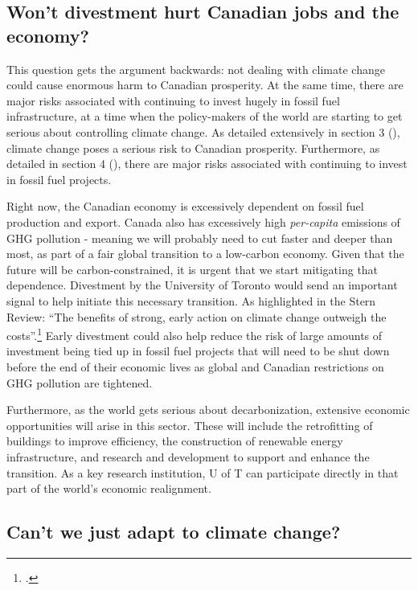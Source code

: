 	\subsection{Won't divestment hurt Canadian jobs and the economy?}
	\label{CanadianJobsEconomy}
	
	

This question gets the argument backwards: not dealing with climate change could cause enormous harm to Canadian prosperity.
At the same time, there are major risks associated with continuing to invest hugely in fossil fuel infrastructure, at a time when the policy-makers of the world are starting to get serious about controlling climate change.
As detailed extensively in section 3 (), climate change poses a serious risk to Canadian prosperity. 
Furthermore, as detailed in section 4 (), there are major risks associated with continuing to invest in fossil fuel projects.


Right now, the Canadian economy is excessively dependent on fossil fuel production and export.
Canada also has excessively high \emph{per-capita} emissions of GHG pollution - meaning we will probably need to cut faster and deeper than most, as part of a fair global transition to a low-carbon economy.
Given that the future will be carbon-constrained, it is urgent that we start mitigating that dependence.
Divestment by the University of Toronto would send an important signal to help initiate this necessary transition.
As highlighted in the Stern Review: ``The benefits of strong, early action on climate change outweigh the costs''.\footcite[][p. i]{Stern2007}
Early divestment could also help reduce the risk of large amounts of investment being tied up in fossil fuel projects that will need to be shut down before the end of their economic lives as global and Canadian restrictions on GHG pollution are tightened.



Furthermore, as the world gets serious about decarbonization, extensive economic opportunities will arise in this sector.
These will include the retrofitting of buildings to improve efficiency, the construction of renewable energy infrastructure, and research and development to support and enhance the transition.
As a key research institution, U of T can participate directly in that part of the world's economic realignment.



	\subsection{Can't we just adapt to climate change?}
	\label{WhyNotAdapt}



